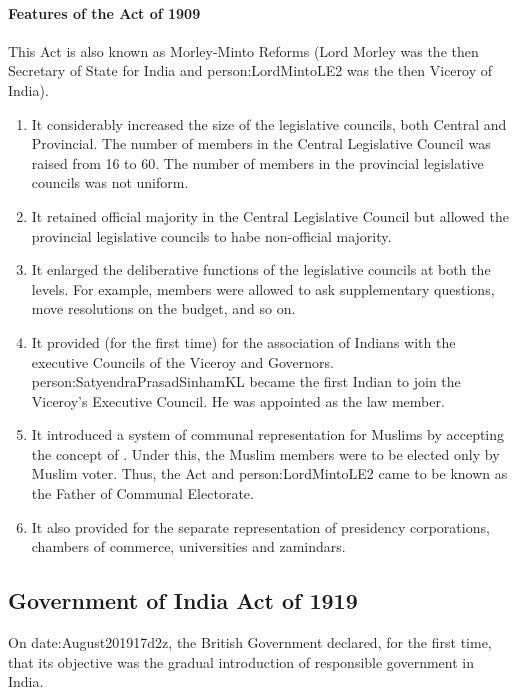 \paragraph{Features of the Act of 1909}
This Act is also known as Morley-Minto Reforms (Lord Morley was the then Secretary of State for India and \gls{person:LordMintoLE2} was the then Viceroy of India).
\begin{enumerate}
  \item It considerably increased the size of the legislative councils, both Central and Provincial. The number of members in the Central Legislative Council was raised from 16 to 60. The number of members in the provincial legislative councils was not uniform.
  \item It retained official majority in the Central Legislative Council but allowed the provincial legislative councils to habe non-official majority.
  \item It enlarged the deliberative functions of the legislative councils at both the levels. For example, members were allowed to ask supplementary questions, move resolutions on the budget, and so on.
  \item It provided (for the first time) for the association of Indians with the executive Councils of the Viceroy and Governors. \gls{person:SatyendraPrasadSinhamKL} became the first Indian to join the Viceroy's Executive Council. He was appointed as the law member.
  \item It introduced a system of communal representation for Muslims by accepting the concept of . Under this, the Muslim members were to be elected only by Muslim voter. Thus, the Act  and \gls{person:LordMintoLE2} came to be known as the Father of Communal Electorate.
  \item It also provided for the separate representation of presidency corporations, chambers of commerce, universities and zamindars.
\end{enumerate}

\subsection{Government of India Act of 1919}

On \gls{date:August201917d2z}, the British Government declared, for the first time, that its objective was the gradual introduction of responsible government in India.


